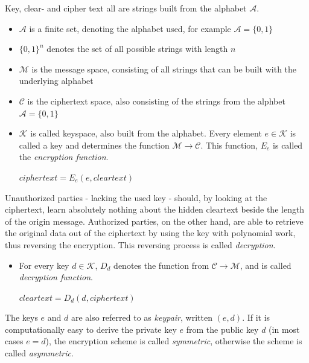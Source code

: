 Key, clear- and cipher text all are strings built from the alphabet $\mathcal{A}$. 

\begin{itemize}
 \item $\mathcal{A}$ is a finite set, denoting the alphabet used, for example
 $\mathcal{A} = \{0, 1\}$
 \item $\{0, 1\}^n$ denotes the set of all possible strings with length $n$
 \item $\mathcal{M}$ is the message space, consisting of all strings that can be built with the 
 underlying alphabet
 \item $\mathcal{C}$ is the ciphertext space, also consisting of the strings from 
 the alphbet
$\mathcal{A} = \{0, 1\}$

\item $\mathcal{K}$ is called keyspace, also built from the alphabet. Every element
 $e \in \mathcal{K}$ is called a key and determines the function $\mathcal{M} \rightarrow \mathcal{C}$.
 This function, $E_e$ is called the \textit{encryption function}. 
  \begin{center}
 $ciphertext = E_e(e, cleartext)$
  \end{center}
\end{itemize}

Unauthorized parties - lacking the used key - should, by looking at the ciphertext, learn
absolutely nothing about the hidden cleartext beside the length of the origin message. Authorized parties, on the other hand, are
able to retrieve the original data out of the ciphertext by using the key with polynomial work, thus reversing
the encryption. This reversing process is called \textit{decryption}.

\begin{itemize}

 \item For every key $d \in \mathcal{K}$, $D_d$ denotes the function from $\mathcal{C} \rightarrow
  \mathcal{M}$, and is called \textit{decryption function}.
  \begin{center}
  $cleartext  = D_d(d, ciphertext)$
    \end{center}
\end{itemize}

The keys $e$ and $d$ are also referred to as \textit{keypair}, written $(e,d)$. 
If it is computationally easy to derive the private key $e$ from the public key $d$ (in most cases $e = d$), the encryption scheme
 is called \textit{symmetric}, otherwise the scheme is called \textit{asymmetric}.

